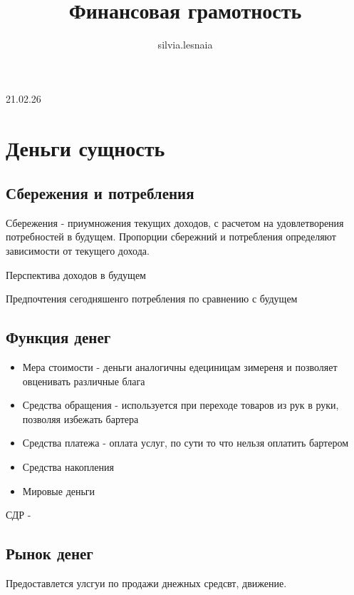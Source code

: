 \documentclass{article}
\title{Финансовая грамотность}
\author{silvia.lesnaia}
\begin{document}
\maketitle

    \large{21.02.26}

    \vspace{2mm}
    \Large{}
    \section{Деньги сущность}
    \subsection{Сбережения и потребления}

    Сбережения - приумножения текущих доходов, с расчетом на удовлетворения 
    потребностей в будущем. Пропорции сбережний и потребления определяют зависимости 
    от текущего дохода.

    Перспектива доходов в будущем

    Предпочтения сегодняшенго потребления по сравнению с будущем

    \subsection{Функция денег}

    \begin{itemize}
        \item Мера стоимости  - деньги аналогичны едециницам зимереня и позволяет овценивать 
        различные блага
        \item Средства обращения - используется при переходе товаров из рук в руки, 
        позволяя избежать бартера 
        \item Средства платежа - оплата услуг, по сути то что нельзя оплатить бартером
        \item Средства накопления 
        \item Мировые деньги
    \end{itemize}
    
    СДР - 

    \subsection{Рынок денег}

    Предоставлется улсгуи по продажи днежных средсвт, движение. 

    \vspace{1cm}
\end{document}
